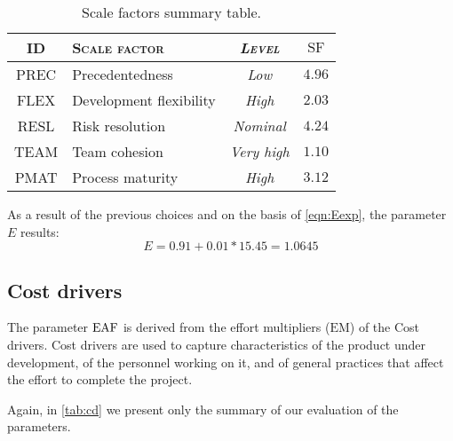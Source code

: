 \begin{table}\begin{tabularx}{\textwidth}{ >{\ttfamily}c X >{\itshape}c c }

\toprule
\normalfont\textsc{ID} & \normalfont\textsc{Scale factor} & \normalfont\textsc{Level} & $ \text{SF} $ \\
\toprule
PREC	& Precedentedness			& Low		& $ 4.96 $ \\ \midrule
FLEX	& Development flexibility	& High		& $ 2.03 $ \\ \midrule
RESL	& Risk resolution			& Nominal	& $ 4.24 $\\ \midrule
TEAM	& Team cohesion				& Very high	& $ 1.10 $\\ \midrule
PMAT	& Process maturity			& High		& $ 3.12 $\\ 

\bottomrule
	
\end{tabularx}

\caption{Scale factors summary table.}
\label{tab:sf}

\end{table}



As a result of the previous choices and on the basis of \cref{eqn:Eexp}, the parameter $ E $ results:
\begin{equation}
	E = 0.91 + 0.01 * 15.45 = 1.0645 \label{eqn:expVAL}
\end{equation}


















\subsection*{Cost drivers} The parameter $ \text{EAF} $ is derived from the effort multipliers ($ \text{EM} $) of the Cost drivers. Cost drivers are used to capture characteristics of the product under development, of the personnel working on it, and of general practices that affect the effort to complete the project. 

Again, in \cref{tab:cd} we present only the summary of our evaluation of the parameters.



